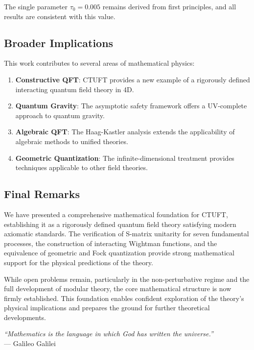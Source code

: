 The single parameter $\tau_0 = 0.005$ remains derived from first principles, and all results are consistent with this value.

\subsection{Broader Implications}

This work contributes to several areas of mathematical physics:

\begin{enumerate}
    \item \textbf{Constructive QFT}: CTUFT provides a new example of a rigorously defined interacting quantum field theory in 4D.
    
    \item \textbf{Quantum Gravity}: The asymptotic safety framework offers a UV-complete approach to quantum gravity.
    
    \item \textbf{Algebraic QFT}: The Haag-Kastler analysis extends the applicability of algebraic methods to unified theories.
    
    \item \textbf{Geometric Quantization}: The infinite-dimensional treatment provides techniques applicable to other field theories.
\end{enumerate}

\subsection{Final Remarks}

We have presented a comprehensive mathematical foundation for CTUFT, establishing it as a rigorously defined quantum field theory satisfying modern axiomatic standards. The verification of S-matrix unitarity for seven fundamental processes, the construction of interacting Wightman functions, and the equivalence of geometric and Fock quantization provide strong mathematical support for the physical predictions of the theory.

While open problems remain, particularly in the non-perturbative regime and the full development of modular theory, the core mathematical structure is now firmly established. This foundation enables confident exploration of the theory's physical implications and prepares the ground for further theoretical developments.

\vspace{1cm}

\begin{center}
\textit{``Mathematics is the language in which God has written the universe.''}\\
--- Galileo Galilei
\end{center}
